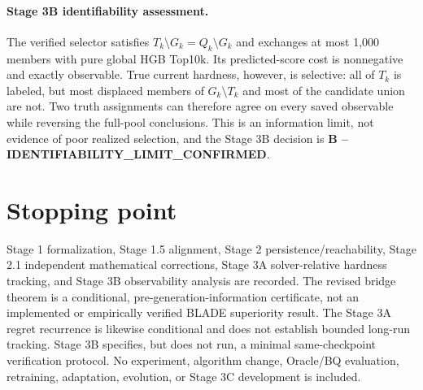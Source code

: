 \documentclass[11pt]{article}
\begin{document}
\paragraph{Stage 3B identifiability assessment.}
The verified selector satisfies
$T_k\setminus G_k=Q_k\setminus G_k$ and exchanges at most 1,000 members with
pure global HGB Top10k.  Its predicted-score cost is nonnegative and exactly
observable.  True current hardness, however, is selective: all of $T_k$ is
labeled, but most displaced members of $G_k\setminus T_k$ and most of the
candidate union are not.  Two truth assignments can therefore agree on every
saved observable while reversing the full-pool conclusions.  This is an
information limit, not evidence of poor realized selection, and the Stage 3B
decision is \textbf{B -- IDENTIFIABILITY\_LIMIT\_CONFIRMED}.

\section{Stopping point}
Stage 1 formalization, Stage 1.5 alignment, Stage 2 persistence/reachability,
Stage 2.1 independent mathematical corrections, Stage 3A solver-relative
hardness tracking, and Stage 3B observability analysis are recorded. The
revised bridge theorem is a conditional, pre-generation-information
certificate, not an implemented or empirically verified BLADE superiority
result. The Stage 3A regret recurrence is likewise conditional and does not
establish bounded long-run tracking.  Stage 3B specifies, but does not run, a
minimal same-checkpoint verification protocol. No experiment, algorithm
change, Oracle/BQ evaluation, retraining, adaptation, evolution, or Stage 3C
development is included.
\end{document}
